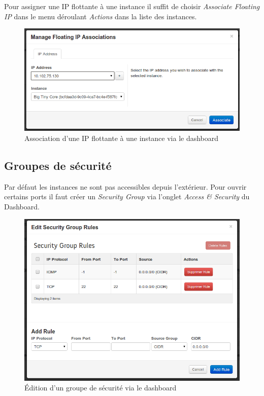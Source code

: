 \documentclass[a4paper,oneside]{report}
\begin{document}
Pour assigner une IP flottante à une instance il suffit de choisir \emph{Associate Floating IP} dans le menu déroulant \emph{Actions} dans la liste des instances.

\begin{figure}[!h]
\centering
\includegraphics[resolution=200]{images/22_ip_float.png}
\caption{Association d'une IP flottante à une instance via le dashboard}
\end{figure}

\subsection{Groupes de sécurité}
Par défaut les instances ne sont pas accessibles depuis l'extérieur. Pour ouvrir certains ports il faut créer un \emph{Security Group}  via l'onglet \emph{Access \& Security} du Dashboard.

\begin{figure}[!h]
\centering
\includegraphics[resolution=200]{images/22_sec_group.png}
\caption{Édition d'un groupe de sécurité via le dashboard}
\end{figure}
\end{document}
